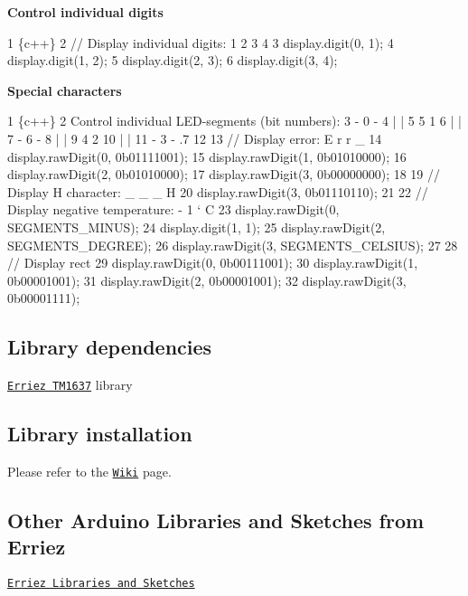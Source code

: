 {\bfseries Control individual digits}


\begin{DoxyCode}
1 \{c++\}
2 // Display individual digits: 1 2 3 4
3 display.digit(0, 1);
4 display.digit(1, 2);
5 display.digit(2, 3);
6 display.digit(3, 4);
\end{DoxyCode}


{\bfseries Special characters}


\begin{DoxyCode}
1 \{c++\}
2 Control individual LED-segments (bit numbers):
3    - 0 -
4    |   |
5    5   1
6    |   |
7    - 6 -
8    |   |
9    4   2
10    |   |
11    - 3 -  .7
12 
13 // Display error: E r r \_
14 display.rawDigit(0, 0b01111001);
15 display.rawDigit(1, 0b01010000);
16 display.rawDigit(2, 0b01010000);
17 display.rawDigit(3, 0b00000000);
18 
19 // Display H character: \_ \_ \_ H
20 display.rawDigit(3, 0b01110110);
21 
22 // Display negative temperature: - 1 ` C
23 display.rawDigit(0, SEGMENTS\_MINUS);
24 display.digit(1, 1);
25 display.rawDigit(2, SEGMENTS\_DEGREE);
26 display.rawDigit(3, SEGMENTS\_CELSIUS);
27 
28 // Display rect
29 display.rawDigit(0, 0b00111001);
30 display.rawDigit(1, 0b00001001);
31 display.rawDigit(2, 0b00001001);
32 display.rawDigit(3, 0b00001111);
\end{DoxyCode}


\subsection*{Library dependencies}


\begin{DoxyItemize}
\item \href{https://github.com/Erriez/ErriezTM1637}{\tt Erriez T\+M1637} library
\end{DoxyItemize}

\subsection*{Library installation}

Please refer to the \href{https://github.com/Erriez/ErriezArduinoLibrariesAndSketches/wiki}{\tt Wiki} page.

\subsection*{Other Arduino Libraries and Sketches from Erriez}


\begin{DoxyItemize}
\item \href{https://github.com/Erriez/ErriezArduinoLibrariesAndSketches}{\tt Erriez Libraries and Sketches} 
\end{DoxyItemize}
